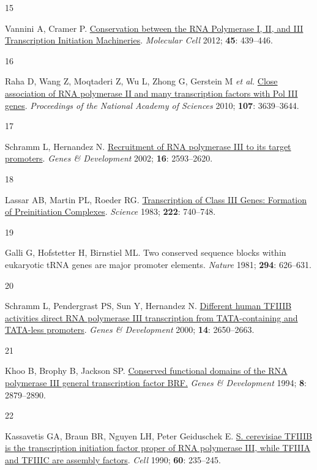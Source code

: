 \documentclass[
  12pt,
]{article}
\newlength{\cslhangindent}
\newlength{\csllabelwidth}
\newlength{\cslentryspacingunit} %
\newenvironment{CSLReferences}[2] %
 {%
  \setlength{\parindent}{0pt}
  \ifodd #1
  \let\oldpar\par
  \def\par{\hangindent=\cslhangindent\oldpar}
  \fi
  \setlength{\parskip}{#2\cslentryspacingunit}
 }%
 {}
\newcommand{\CSLLeftMargin}[1]{\parbox[t]{\csllabelwidth}{#1}}
\newcommand{\CSLRightInline}[1]{\parbox[t]{\linewidth - \csllabelwidth}{#1}\break}
\begin{document}
\begin{CSLReferences}{0}{0}
\leavevmode{}%
\CSLLeftMargin{15 }%
\CSLRightInline{Vannini A, Cramer P. \href{https://doi.org/10.1016/j.molcel.2012.01.023}{Conservation between the RNA Polymerase I, II, and III Transcription Initiation Machineries}. \emph{Molecular Cell} 2012; \textbf{45}: 439--446.}

\leavevmode{}%
\CSLLeftMargin{16 }%
\CSLRightInline{Raha D, Wang Z, Moqtaderi Z, Wu L, Zhong G, Gerstein M \emph{et al.} \href{https://doi.org/10.1073/pnas.0911315106}{Close association of RNA polymerase II and many transcription factors with Pol III genes}. \emph{Proceedings of the National Academy of Sciences} 2010; \textbf{107}: 3639--3644.}

\leavevmode{}%
\CSLLeftMargin{17 }%
\CSLRightInline{Schramm L, Hernandez N. \href{https://doi.org/10.1101/gad.1018902}{Recruitment of RNA polymerase III to its target promoters}. \emph{Genes \& Development} 2002; \textbf{16}: 2593--2620.}

\leavevmode{}%
\CSLLeftMargin{18 }%
\CSLRightInline{Lassar AB, Martin PL, Roeder RG. \href{https://doi.org/10.1126/science.6356356}{Transcription of Class III Genes: Formation of Preinitiation Complexes}. \emph{Science} 1983; \textbf{222}: 740--748.}

\leavevmode{}%
\CSLLeftMargin{19 }%
\CSLRightInline{Galli G, Hofstetter H, Birnstiel ML. Two conserved sequence blocks within eukaryotic {tRNA} genes are major promoter elements. \emph{Nature} 1981; \textbf{294}: 626--631.}

\leavevmode{}%
\CSLLeftMargin{20 }%
\CSLRightInline{Schramm L, Pendergrast PS, Sun Y, Hernandez N. \href{https://doi.org/10.1101/gad.836400}{Different human TFIIIB activities direct RNA polymerase III transcription from TATA-containing and TATA-less promoters}. \emph{Genes \& Development} 2000; \textbf{14}: 2650--2663.}

\leavevmode{}%
\CSLLeftMargin{21 }%
\CSLRightInline{Khoo B, Brophy B, Jackson SP. \href{https://doi.org/10.1101/gad.8.23.2879}{Conserved functional domains of the RNA polymerase III general transcription factor BRF.} \emph{Genes \& Development} 1994; \textbf{8}: 2879--2890.}

\leavevmode{}%
\CSLLeftMargin{22 }%
\CSLRightInline{Kassavetis GA, Braun BR, Nguyen LH, Peter Geiduschek E. \href{https://doi.org/10.1016/0092-8674(90)90739-2}{S. cerevisiae TFIIIB is the transcription initiation factor proper of RNA polymerase III, while TFIIIA and TFIIIC are assembly factors}. \emph{Cell} 1990; \textbf{60}: 235--245.}


\end{CSLReferences}
\end{document}
